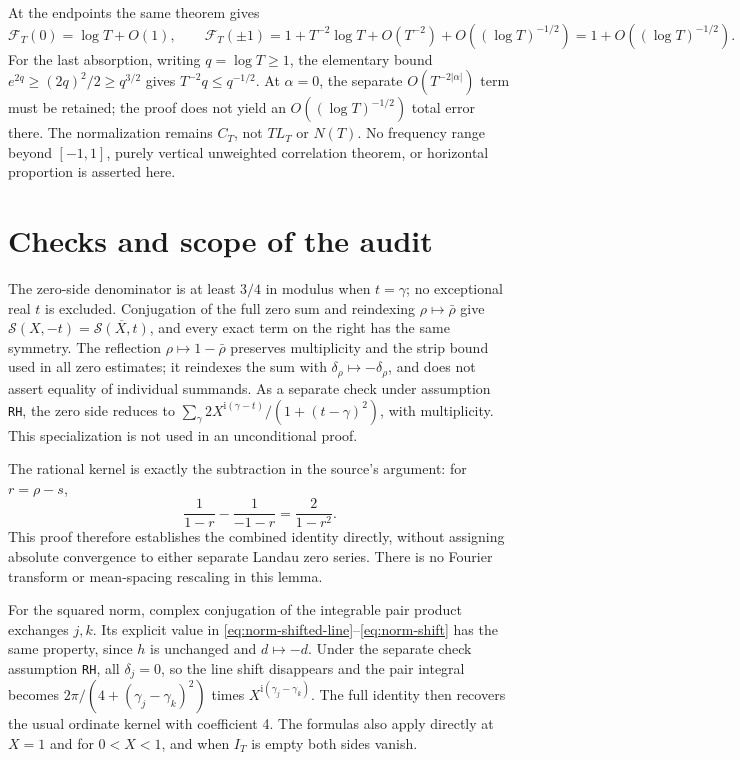 \documentclass[11pt]{article}
\newcommand{\ii}{\mathrm i}
\newcommand{\ZS}{\mathcal S}
\begin{document}
At the endpoints the same theorem gives
\[
 \mathcal F_T(0)=\log T+O(1),\qquad
 \mathcal F_T(\pm1)=1+T^{-2}\log T
      +O(T^{-2})+O((\log T)^{-1/2})
      =1+O((\log T)^{-1/2}).
\]
For the last absorption, writing \(q=\log T\geq1\), the elementary
bound \(e^{2q}\geq(2q)^2/2\geq q^{3/2}\) gives
\(T^{-2}q\leq q^{-1/2}\).
At \(\alpha=0\), the separate \(O(T^{-2|\alpha|})\) term must be
retained; the proof does not yield an \(O((\log T)^{-1/2})\) total error
there. The normalization remains \(C_T\), not \(TL_T\) or \(N(T)\).
No frequency range beyond \([-1,1]\), purely vertical unweighted
correlation theorem, or horizontal proportion is asserted here.

\section{Checks and scope of the audit}\label{sec:checks}

The zero-side denominator is at least \(3/4\) in modulus when
\(t=\gamma\); no exceptional real \(t\) is excluded.
Conjugation of the full zero sum and reindexing \(\rho\mapsto\bar\rho\)
give \(\ZS(X,-t)=\overline{\ZS(X,t)}\), and every exact term on the
right has the same symmetry. The reflection \(\rho\mapsto1-\bar\rho\)
preserves multiplicity and the strip bound used in all zero estimates;
it reindexes the sum with \(\delta_\rho\mapsto-\delta_\rho\), and
does not assert equality of individual summands. As a separate check
under assumption \texttt{RH}, the zero side reduces to
\(\sum_\gamma 2X^{\ii(\gamma-t)}/(1+(t-\gamma)^2)\), with
multiplicity. This specialization is not used in an unconditional proof.

The rational kernel is exactly the subtraction in the source's argument:
for \(r=\rho-s\),
\[
 \frac1{1-r}-\frac1{-1-r}=\frac2{1-r^2}.
\]
This proof therefore establishes the combined identity directly, without
assigning absolute convergence to either separate Landau zero series.
There is no Fourier transform or mean-spacing rescaling in this lemma.

For the squared norm, complex conjugation of the integrable pair product
exchanges \(j,k\). Its explicit value in
\eqref{eq:norm-shifted-line}--\eqref{eq:norm-shift} has the same property,
since \(h\) is unchanged and \(d\mapsto-d\).
Under the separate check assumption \texttt{RH}, all \(\delta_j=0\),
so the line shift disappears and the pair integral becomes
\(2\pi/(4+(\gamma_j-\gamma_k)^2)\) times
\(X^{\ii(\gamma_j-\gamma_k)}\).
The full identity then recovers the usual ordinate kernel with coefficient
4. The formulas also apply directly at \(X=1\) and for \(0<X<1\),
and when \(I_T\) is empty both sides vanish.
\end{document}
